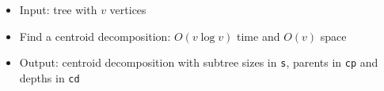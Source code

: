 \begin{itemize}
	\item Input: tree with $v$ vertices
	\item Find a centroid decomposition: $O(v\log{v})$ time and $O(v)$ space
	\item Output: centroid decomposition with subtree sizes in \lstinline{s}, parents in \lstinline{cp} and depths in \lstinline{cd}
\end{itemize}
